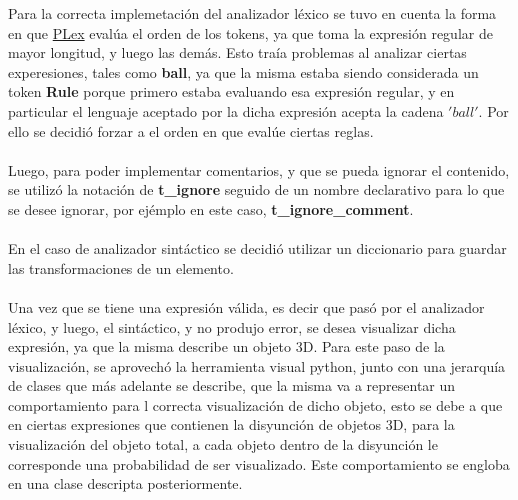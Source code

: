 Para la correcta implemetaci\'on del analizador l\'exico se tuvo en cuenta la forma en que \href{http://www.dabeaz.com/ply/ply.html#ply_nn3}{PLex} eval\'ua el orden de los tokens, ya que toma la expresi\'on regular de mayor longitud, y luego las dem\'as. Esto tra\'ia problemas al analizar ciertas experesiones, tales como \textbf{ball}, ya que la misma estaba siendo considerada un token \textbf{Rule} porque primero estaba evaluando esa expresi\'on regular, y en particular el lenguaje aceptado por la dicha expresi\'on acepta la cadena $'ball'$. Por ello se decidi\'o forzar a el orden en que eval\'ue ciertas reglas.
\\
\\
Luego, para poder implementar comentarios, y que se pueda ignorar el contenido, se utiliz\'o la notaci\'on de \textbf{t\_ignore} seguido de un nombre declarativo para lo que se desee ignorar, por ej\'emplo en este caso, \textbf{t\_ignore\_comment}.
\\
\\
En el caso de analizador sint\'actico se decidi\'o utilizar un diccionario para guardar las transformaciones de un elemento.
\\
\\
Una vez que se tiene una expresi\'on v\'alida, es decir que pas\'o por el analizador l\'exico, y luego, el sint\'actico, y no produjo error, se desea visualizar dicha expresi\'on, ya que la misma describe un objeto 3D. Para este paso de la visualizaci\'on, se aprovech\'o la herramienta visual python, junto con una jerarqu\'ia de clases que m\'as adelante se describe, que la misma va a representar un comportamiento para l correcta visualizaci\'on de dicho objeto, esto se debe a que en ciertas expresiones que contienen la disyunci\'on de objetos 3D, para la visualizaci\'on del objeto total, a cada objeto dentro de la disyunci\'on le corresponde una probabilidad de ser visualizado. Este comportamiento se engloba en una clase descripta posteriormente.


